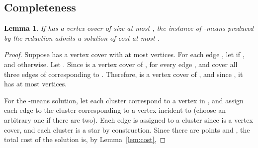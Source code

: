 \documentclass{scrartcl}
\newtheorem{lemma}[theorem]{Lemma}
\begin{document}
\subsection{Completeness} \begin{lemma}
If  has a vertex cover of size at most , the instance of -means produced by the reduction admits a solution of cost at most .
\end{lemma}
\begin{proof}
Suppose  has a vertex cover  with at most  vertices.
For each edge , let  if , and  otherwise. 
Let . Since  is a vertex cover of , for every edge ,  and  cover all three edges of  corresponding to . 
Therefore,  is a vertex cover of , and since , it has at most  vertices. 

For the -means solution, let each cluster correspond to a vertex in , and assign each edge  to the cluster corresponding to a vertex incident to  (choose an arbitrary one if there are two). 
Each edge is assigned to a cluster since  is a vertex cover, and each cluster is a star by construction.
Since there are  points and , the total cost of the solution is, by Lemma~\ref{lem:cost},

\end{proof}
\end{document}
